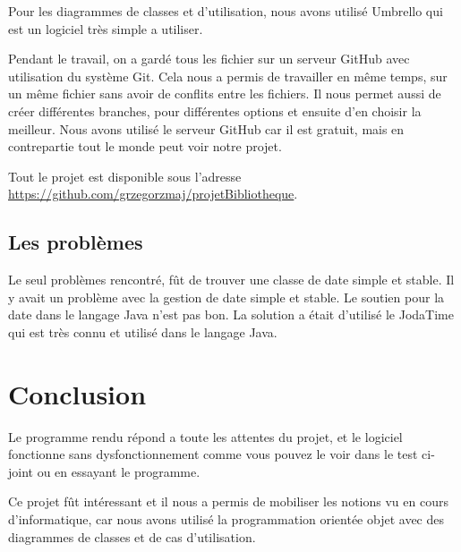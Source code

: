 \documentclass[10pt, a4paper]{article}
\begin{document}
		Pour les diagrammes de classes et d'utilisation, nous avons utilisé Umbrello qui est un logiciel 	
		très simple a utiliser.
		
		Pendant le travail, on a gardé tous les fichier sur un serveur GitHub avec utilisation du système 
		Git. Cela nous a permis de travailler en même temps, sur un même fichier sans avoir de conflits entre 
		les fichiers. Il nous permet aussi de créer différentes branches, pour différentes options et 
		ensuite d'en choisir la meilleur. Nous avons utilisé le serveur GitHub car il est gratuit, mais en 
		contrepartie tout le monde peut voir notre projet.
		
		Tout le projet est disponible sous l'adresse
		\url{https://github.com/grzegorzmaj/projetBibliotheque}.
		
		\subsection{Les problèmes}
		
		Le seul problèmes rencontré, fût de trouver une classe de date simple et stable. Il y avait un problème avec la gestion de 
		date simple et stable. Le soutien pour la date dans le langage Java n'est pas bon. La solution a était d'utilisé le JodaTime 
		qui est très connu et utilisé dans le langage Java.
		
		\section{Conclusion}
		
		Le programme rendu répond a toute les attentes du projet, et le logiciel fonctionne sans dysfonctionnement comme vous pouvez
		le voir dans le test ci-joint ou en essayant le programme.
		
		\bigbreak
		
		Ce projet fût intéressant et il nous a permis de mobiliser les notions vu en cours d'informatique, car nous avons utilisé la 
		programmation	orientée objet avec des diagrammes de classes et de cas d'utilisation.
\end{document}
